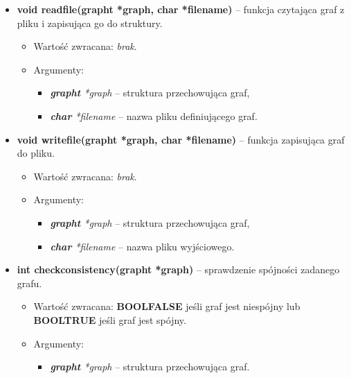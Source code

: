 \documentclass{article}
\begin{document}
\begin{itemize}
    \item \textbf{void read\textunderscore file(graph\textunderscore t *graph, char *filename)} -- funkcja czytająca graf z pliku i zapisująca go do struktury.
    \begin{itemize}
        \item Wartość zwracana: \textit{brak}.
        \item Argumenty:
            \begin{itemize}
                \item \textit{\textbf{graph\textunderscore t} *graph} -- struktura przechowująca graf,
                \item \textit{\textbf{char} *filename} -- nazwa pliku definiującego graf.
            \end{itemize}
    \end{itemize}
    
    \item \textbf{void write\textunderscore file(graph\textunderscore t *graph, char *filename)} -- funkcja zapisująca graf do pliku.
    \begin{itemize}
        \item Wartość zwracana: \textit{brak}.
        \item Argumenty:
            \begin{itemize}
                \item \textit{\textbf{graph\textunderscore t} *graph} -- struktura przechowująca graf,
                \item \textit{\textbf{char} *filename} -- nazwa pliku wyjściowego.
            \end{itemize}
    \end{itemize}
    
    \item \textbf{int check\textunderscore consistency(graph\textunderscore t *graph)} -- sprawdzenie spójności zadanego grafu.
    \begin{itemize}
        \item Wartość zwracana: \textbf{BOOL\textunderscore FALSE} jeśli graf jest niespójny \linebreak lub \textbf{BOOL\textunderscore TRUE} jeśli graf jest spójny.
        \item Argumenty:
            \begin{itemize}
                \item \textit{\textbf{graph\textunderscore t} *graph} -- struktura przechowująca graf.
            \end{itemize}
    \end{itemize}
    

\end{itemize}
\end{document}
